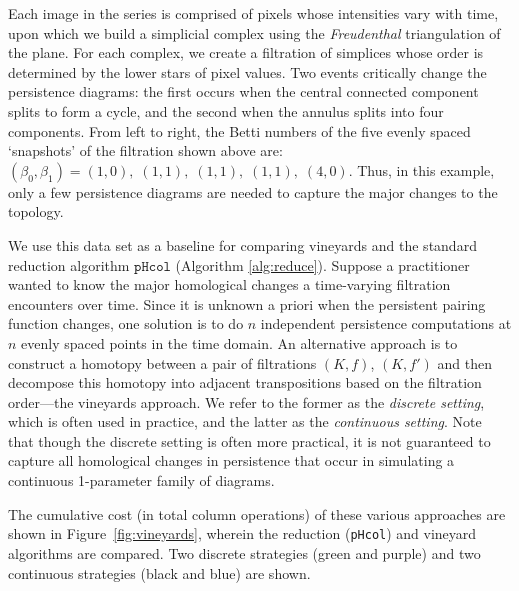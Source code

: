 \documentclass[sn-mathphys]{sn-jnl}
\begin{document}
Each image in the series is comprised of pixels whose intensities vary with time, upon which we build a simplicial complex using the \emph{Freudenthal} triangulation of the plane. For each complex, we create a filtration of simplices whose order is determined by the lower stars of pixel values.   
Two events critically change the persistence diagrams: the first occurs when the central connected component splits to form a cycle, and the second  when the annulus  splits into four components. 
From left to right, the Betti numbers of the five evenly spaced `snapshots' of the filtration shown above are: $(\beta_0,\beta_1)  = (1,0), \; (1,1),  \; (1,1), \; (1,1), \; (4,0)$.
Thus, in this example, only a few persistence diagrams are needed to capture the major changes to the topology. 

We use this data set as a baseline for comparing vineyards and the standard reduction algorithm $\texttt{pHcol}$ (Algorithm \ref{alg:reduce}). Suppose a practitioner wanted to know the major homological changes a time-varying filtration encounters over time.
Since it is unknown a priori when the persistent pairing function changes, one solution is to do $n$ independent persistence computations at $n$ evenly spaced points in the time domain.  An alternative approach is to construct a homotopy between a pair of filtrations $(K, f)$, $(K,f')$ and then decompose this homotopy into adjacent transpositions based on the filtration order---the vineyards approach. 
 We refer to the former as the \emph{discrete setting}, which is often used in practice, and the  latter as the \emph{continuous setting}. Note that though the discrete setting is often more practical, it is not guaranteed to capture all homological changes in persistence that occur in simulating a continuous 1-parameter family of diagrams.  

The cumulative cost (in total column operations) of these various approaches are shown in Figure~\ref{fig:vineyards}, wherein the reduction (\texttt{pHcol}) and vineyard algorithms are compared. Two discrete strategies (green and purple) and two continuous strategies (black and blue) are shown.
\end{document}
